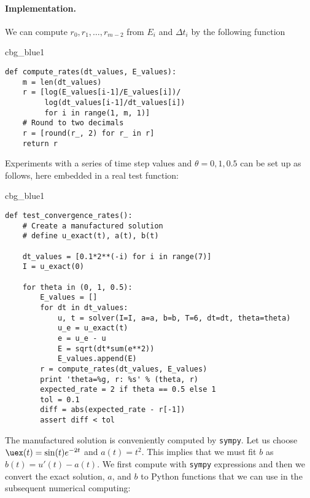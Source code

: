 \documentclass[graybox,sectrefs,envcountresetchap,open=right,final]{svmonodo}
\newenvironment{_cod_tight}[1]{
   \def\FrameCommand{\colorbox{#1}}
   \FrameRule0.6pt\MakeFramed {\FrameRestore}\vskip3mm}
   {\vskip0mm\endMakeFramed}
\newenvironment{cod}[1]{
\bgroup\rmfamily
\fboxsep=0mm\relax
\begin{_cod_tight}{#1}
\list{}{\parsep=-2mm\parskip=0mm\topsep=0pt\leftmargin=2mm
\rightmargin=2\leftmargin\leftmargin=4pt\relax}
\item\relax}
{\endlist\end{_cod_tight}\egroup}
\begin{document}
\paragraph{Implementation.}
We can compute $r_0, r_1, \ldots, r_{m-2}$ from $E_i$ and $\Delta t_i$
by the following function

\begin{cod}{cbg_blue1}\begin{Verbatim}[numbers=none,fontsize=\fontsize{9pt}{9pt},baselinestretch=0.95,xleftmargin=2mm]
def compute_rates(dt_values, E_values):
    m = len(dt_values)
    r = [log(E_values[i-1]/E_values[i])/
         log(dt_values[i-1]/dt_values[i])
         for i in range(1, m, 1)]
    # Round to two decimals
    r = [round(r_, 2) for r_ in r]
    return r
\end{Verbatim}
\end{cod}
\noindent

Experiments with a series of time step values and $\theta=0,1,0.5$
can be set up as follows, here embedded in a real test function:

\begin{cod}{cbg_blue1}\begin{Verbatim}[numbers=none,fontsize=\fontsize{9pt}{9pt},baselinestretch=0.95,xleftmargin=2mm]
def test_convergence_rates():
    # Create a manufactured solution
    # define u_exact(t), a(t), b(t)

    dt_values = [0.1*2**(-i) for i in range(7)]
    I = u_exact(0)

    for theta in (0, 1, 0.5):
        E_values = []
        for dt in dt_values:
            u, t = solver(I=I, a=a, b=b, T=6, dt=dt, theta=theta)
            u_e = u_exact(t)
            e = u_e - u
            E = sqrt(dt*sum(e**2))
            E_values.append(E)
        r = compute_rates(dt_values, E_values)
        print 'theta=%g, r: %s' % (theta, r)
        expected_rate = 2 if theta == 0.5 else 1
        tol = 0.1
        diff = abs(expected_rate - r[-1])
        assert diff < tol
\end{Verbatim}
\end{cod}
\noindent

The manufactured solution is conveniently computed by \texttt{sympy}.
Let us choose $\uex(t) = \sin(t)e^{-2t}$ and $a(t)=t^2$.
This implies that we must fit $b$ as $b(t)=u'(t)-a(t)$.
We first compute with \texttt{sympy} expressions and then we convert
the exact solution, $a$, and $b$ to Python functions that we
can use in the subsequent numerical computing:
\end{document}
